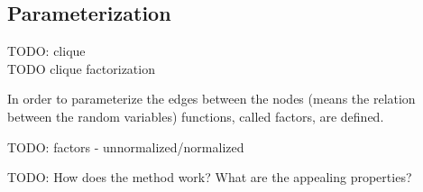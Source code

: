 \subsection{Parameterization}

TODO: clique \\
TODO clique factorization

In order to parameterize the edges between the nodes (means the relation between the random variables) functions, called factors, are defined. 


TODO: factors - unnormalized/normalized


TODO: How does the method work? What are the appealing properties?
